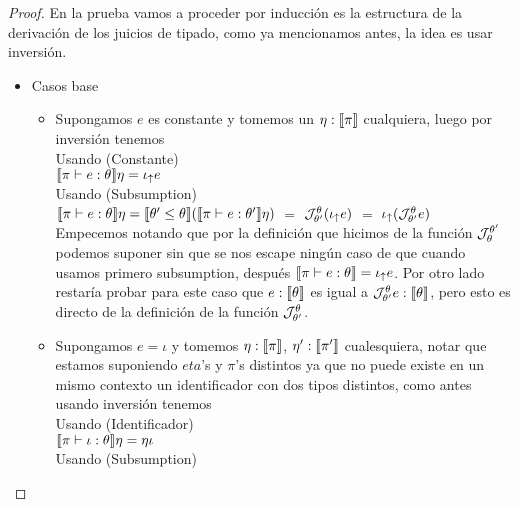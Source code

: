 \begin{proof}
En la prueba vamos a proceder por inducci\'on es la estructura de la derivaci\'on 
de los juicios de tipado, como ya mencionamos antes, la idea es usar inversi\'on.\\

\begin{itemize}

\item Casos base
\begin{itemize}
\item Supongamos $e$ es constante y tomemos un $\eta : \llbracket \pi \rrbracket$ cualquiera, 
luego por inversi\'on tenemos\\

Usando (Constante)\\

$\llbracket \pi \vdash e : \theta \rrbracket\eta = \iota_{\uparrow} e$\\

Usando (Subsumption)\\

$\llbracket \pi \vdash e : \theta \rrbracket\eta = 
\llbracket \theta' \leq \theta \rrbracket(\llbracket \pi \vdash e : \theta' \rrbracket\eta)$ $=$
$\mathcal{J}_{\theta'}^{\theta} (\iota_{\uparrow} e)$ $=$ $\iota_{\uparrow} (\mathcal{J}_{\theta'}^{\theta} e)$\\

Empecemos notando que por la definici\'on que hicimos de la funci\'on $\mathcal{J}_{\theta}^{\theta'}$
podemos suponer sin que se nos escape ning\'un caso de que cuando usamos primero
subsumption, despu\'es $\llbracket \pi \vdash e : \theta \rrbracket = \iota_{\uparrow} e$. Por otro lado
restar\'ia probar para este caso que $e : \llbracket \theta \rrbracket$  es igual a 
$\mathcal{J}_{\theta'}^{\theta} e : \llbracket \theta \rrbracket$, pero esto es directo de la definici\'on
de la funci\'on $\mathcal{J}_{\theta'}^{\theta}$.

\item Supongamos $e = \iota$ y tomemos $\eta : \llbracket \pi \rrbracket$, $\eta' : \llbracket \pi' \rrbracket$
cualesquiera, notar que estamos suponiendo $eta$'s y $\pi$'s distintos ya que 
no puede existe en un mismo contexto un identificador con dos tipos distintos, como 
antes usando inversi\'on tenemos\\

Usando (Identificador)\\

$\llbracket \pi \vdash \iota : \theta \rrbracket\eta = \eta \iota$\\

Usando (Subsumption)\\


\end{itemize}
\end{itemize}
\end{proof}
